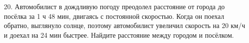 20. Автомобилист в дождливую погоду преодолел расстояние от города до посёлка за 1 ч 48 мин, двигаясь с постоянной скоростью. Когда он поехал обратно, выглянуло солнце, поэтому автомобилист увеличил скорость на 20 км/ч и доехал на 24 мин быстрее. Найдите расстояние между городом и посёлком.\\
